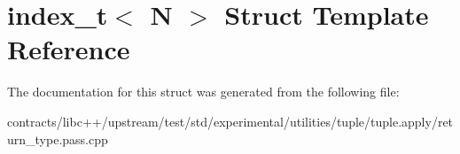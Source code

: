 \hypertarget{structindex__t}{}\section{index\+\_\+t$<$ N $>$ Struct Template Reference}
\label{structindex__t}


The documentation for this struct was generated from the following file\+:\begin{DoxyCompactItemize}
\item 
contracts/libc++/upstream/test/std/experimental/utilities/tuple/tuple.\+apply/return\+\_\+type.\+pass.\+cpp\end{DoxyCompactItemize}
